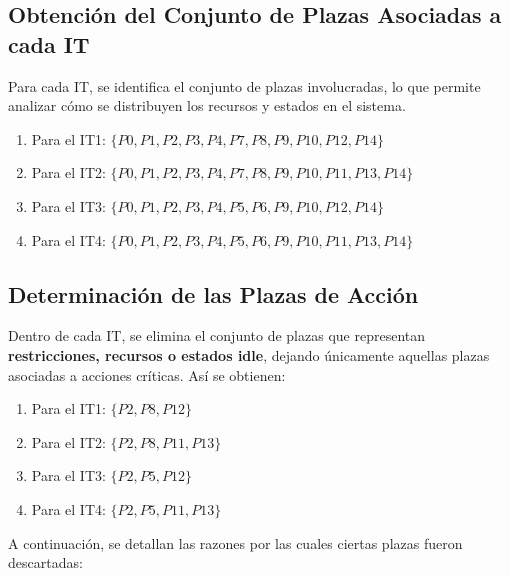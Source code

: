 \documentclass[12pt]{article}
\begin{document}
\subsection{Obtención del Conjunto de Plazas Asociadas a cada IT}
Para cada IT, se identifica el conjunto de plazas involucradas, lo que permite analizar cómo se distribuyen los recursos y estados en el sistema. 
\begin{enumerate}
    \item Para el IT1: $\{P0, P1, P2, P3, P4, P7, P8, P9, P10, P12, P14\}$
    \item Para el IT2: $\{P0, P1, P2, P3, P4, P7, P8, P9, P10, P11, P13, P14\}$
    \item Para el IT3: $\{P0, P1, P2, P3, P4, P5, P6, P9, P10, P12, P14\}$
    \item Para el IT4: $\{P0, P1, P2, P3, P4, P5, P6, P9, P10, P11, P13, P14\}$
\end{enumerate}

\subsection{Determinación de las Plazas de Acción}  
Dentro de cada IT, se elimina el conjunto de plazas que representan \textbf{restricciones, recursos o estados idle}, dejando únicamente aquellas plazas asociadas a acciones críticas. Así se obtienen:

\begin{enumerate}  
    \item Para el IT1: $\{P2, P8, P12\}$  
    \item Para el IT2: $\{P2, P8, P11, P13\}$  
    \item Para el IT3: $\{P2, P5, P12\}$  
    \item Para el IT4: $\{P2, P5, P11, P13\}$  
\end{enumerate}  

A continuación, se detallan las razones por las cuales ciertas plazas fueron descartadas:
\end{document}
